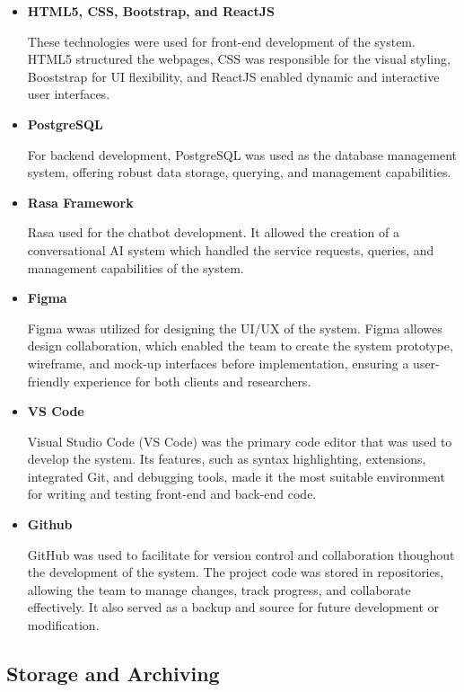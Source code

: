 \begin{itemize}
	\item \textbf{HTML5, CSS, Bootstrap, and ReactJS}
	
	These technologies were used for front-end development of the system. HTML5 structured the webpages, CSS was responsible for the visual styling, Booststrap for UI $ $flexibility, and ReactJS enabled dynamic and interactive user interfaces.
	
	\item \textbf{PostgreSQL}
	
	For backend development, PostgreSQL was used as the database management system, offering robust data storage, querying, and management capabilities.
	
	\item \textbf{Rasa Framework}
	
	Rasa used for the chatbot development. It allowed the creation of a conversational AI system which handled the service requests, queries, and management capabilities of the system.
	
	\item \textbf{Figma}
	
	Figma wwas utilized for designing the UI/UX of the system. Figma allowes design collaboration, which enabled the team to create the system prototype, wireframe, and mock-up interfaces before implementation, ensuring a user-friendly experience for both clients and researchers.
	
	\item \textbf{VS Code}
	
	Visual Studio Code (VS Code) was the primary code editor that was used to develop the system. Its features, such as syntax highlighting, extensions, integrated Git, and debugging tools, made it the most suitable environment for writing and testing front-end and back-end code.
	
	\item \textbf{Github}
	
	GitHub was used to facilitate for version control and collaboration thoughout the development of the system. The project code was stored in repositories, allowing the team to manage changes, track progress, and collaborate effectively. It also served as a backup and source for future development or modification.
	
\end{itemize}

\subsection{Storage and Archiving}

